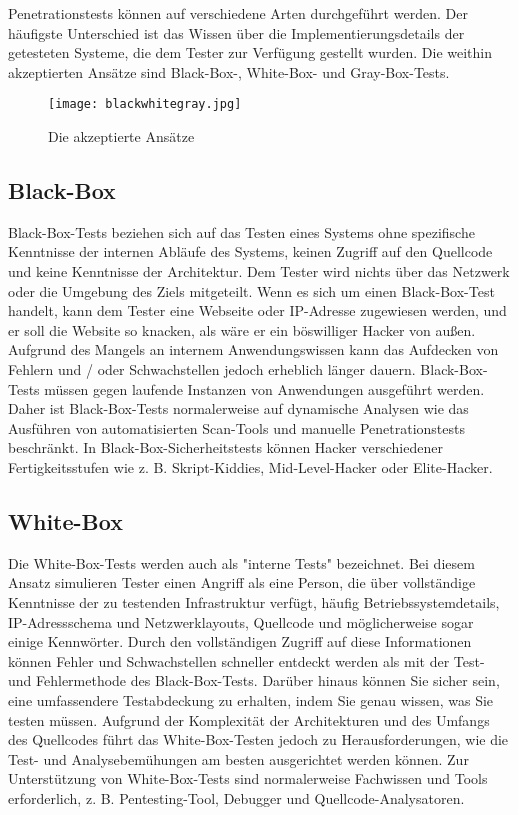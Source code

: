 Penetrationstests können auf verschiedene Arten durchgeführt werden. Der häufigste Unterschied ist das Wissen über die Implementierungsdetails der getesteten Systeme, die dem Tester zur Verfügung gestellt wurden. Die weithin akzeptierten Ansätze sind Black-Box-, White-Box- und Gray-Box-Tests.

\begin{figure}[h]
	\centering
	\texttt{[image: blackwhitegray.jpg]}
	\caption{Die akzeptierte Ansätze\cite{bwgtesting16}}
\end{figure}

\subsection{Black-Box}

Black-Box-Tests beziehen sich auf das Testen eines Systems ohne spezifische Kenntnisse der internen Abläufe des Systems, keinen Zugriff auf den Quellcode und keine Kenntnisse der Architektur\cite{bwgwebtesting07}. Dem Tester wird nichts über das Netzwerk oder die Umgebung des Ziels mitgeteilt\cite{tiller2004ethical}. Wenn es sich um einen Black-Box-Test handelt, kann dem Tester eine Webseite oder IP-Adresse zugewiesen werden, und er soll die Website so knacken, als wäre er ein böswilliger Hacker von außen\cite{whitaker2005penetration}. Aufgrund des Mangels an internem Anwendungswissen kann das Aufdecken von Fehlern und / oder Schwachstellen jedoch erheblich länger dauern. Black-Box-Tests müssen gegen laufende Instanzen von Anwendungen ausgeführt werden. Daher ist Black-Box-Tests normalerweise auf dynamische Analysen wie das Ausführen von automatisierten Scan-Tools und manuelle Penetrationstests beschränkt\cite{bwgwebtesting07}. In Black-Box-Sicherheitstests können Hacker verschiedener Fertigkeitsstufen wie z. B. Skript-Kiddies, Mid-Level-Hacker oder Elite-Hacker\cite{bwgprole18}.

\subsection{White-Box}

Die White-Box-Tests werden auch als "interne Tests" bezeichnet. Bei diesem Ansatz simulieren Tester einen Angriff als eine Person, die über vollständige Kenntnisse der zu testenden Infrastruktur verfügt, häufig Betriebssystemdetails, IP-Adressschema und Netzwerklayouts, Quellcode und möglicherweise sogar einige Kennwörter\cite{ali2011pt}. Durch den vollständigen Zugriff auf diese Informationen können Fehler und Schwachstellen schneller entdeckt werden als mit der Test- und Fehlermethode des Black-Box-Tests. Darüber hinaus können Sie sicher sein, eine umfassendere Testabdeckung zu erhalten, indem Sie genau wissen, was Sie testen müssen. Aufgrund der Komplexität der Architekturen und des Umfangs des Quellcodes führt das White-Box-Testen jedoch zu Herausforderungen, wie die Test- und Analysebemühungen am besten ausgerichtet werden können. Zur Unterstützung von White-Box-Tests sind normalerweise Fachwissen und Tools erforderlich, z. B. Pentesting-Tool, Debugger und Quellcode-Analysatoren\cite{bwgwebtesting07}.

